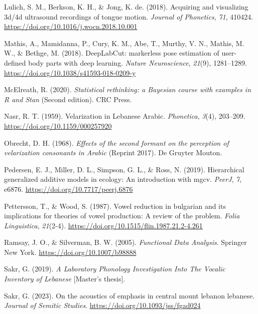 \documentclass[
  man,
  longtable,
  nolmodern,
  notxfonts,
  notimes,
  colorlinks=true,linkcolor=blue,citecolor=blue,urlcolor=blue]{apa7}
\newlength{\cslhangindent}
\newenvironment{CSLReferences}[2] %
 {\begin{list}{}{%
  \setlength{\itemindent}{0pt}
  \setlength{\leftmargin}{0pt}
  \setlength{\parsep}{0pt}
  \ifodd #1
   \setlength{\leftmargin}{\cslhangindent}
   \setlength{\itemindent}{-1\cslhangindent}
  \fi
  \setlength{\itemsep}{#2\baselineskip}}}
 {\end{list}}
\begin{document}
\begin{CSLReferences}{1}{0}
Lulich, S. M., Berkson, K. H., \& Jong, K. de. (2018). Acquiring and
visualizing 3d/4d ultrasound recordings of tongue motion. \emph{Journal
of Phonetics}, \emph{71}, 410424.
\url{https://doi.org/10.1016/j.wocn.2018.10.001}

Mathis, A., Mamidanna, P., Cury, K. M., Abe, T., Murthy, V. N., Mathis,
M. W., \& Bethge, M. (2018). DeepLabCut: markerless pose estimation of
user-defined body parts with deep learning. \emph{Nature Neuroscience},
\emph{21}(9), 1281--1289.
\url{https://doi.org/10.1038/s41593-018-0209-y}

McElreath, R. (2020). \emph{Statistical rethinking: a Bayesian course
with examples in R and Stan} (Second edition). CRC Press.

Nasr, R. T. (1959). Velarization in Lebanese Arabic. \emph{Phonetica},
\emph{3}(4), 203--209. \url{https://doi.org/10.1159/000257920}

Obrecht, D. H. (1968). \emph{Effects of the second formant on the
perception of velarization consonants in Arabic} (Reprint 2017). De
Gruyter Mouton.

Pedersen, E. J., Miller, D. L., Simpson, G. L., \& Ross, N. (2019).
Hierarchical generalized additive models in ecology: An introduction
with mgcv. \emph{PeerJ}, \emph{7}, e6876.
\url{https://doi.org/10.7717/peerj.6876}

Pettersson, T., \& Wood, S. (1987). Vowel reduction in bulgarian and its
implications for theories of vowel production: A review of the problem.
\emph{Folia Linguistica}, \emph{21}(2-4).
\url{https://doi.org/10.1515/flin.1987.21.2-4.261}

Ramsay, J. O., \& Silverman, B. W. (2005). \emph{Functional Data
Analysis}. Springer New York. \url{https://doi.org/10.1007/b98888}

Sakr, G. (2019). \emph{A Laboratory Phonology Investigation Into The
Vocalic Inventory of Lebanese} {[}Master's thesis{]}.

Sakr, G. (2023). On the acoustics of emphasis in central mount lebanon
lebanese. \emph{Journal of Semitic Studies}.
\url{https://doi.org/10.1093/jss/fgad024}


\end{CSLReferences}
\end{document}
